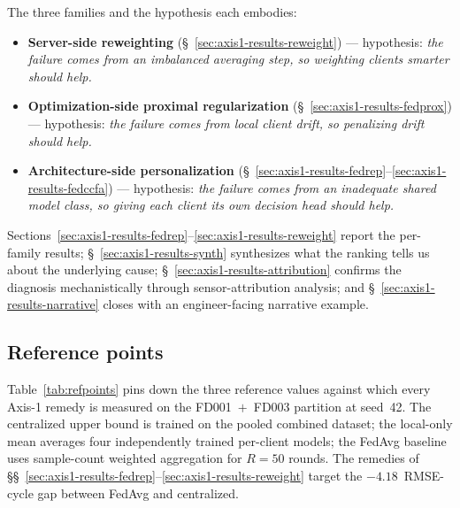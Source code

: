 \documentclass[preprint,12pt,authoryear]{elsarticle}
\begin{document}
The three families and the hypothesis each embodies:
\begin{itemize}
    \item \textbf{Server-side reweighting} (\S~\ref{sec:axis1-results-reweight}) --- hypothesis: \emph{the failure comes from an imbalanced averaging step, so weighting clients smarter should help.}
    \item \textbf{Optimization-side proximal regularization} (\S~\ref{sec:axis1-results-fedprox}) --- hypothesis: \emph{the failure comes from local client drift, so penalizing drift should help.}
    \item \textbf{Architecture-side personalization} (\S~\ref{sec:axis1-results-fedrep}--\ref{sec:axis1-results-fedccfa}) --- hypothesis: \emph{the failure comes from an inadequate shared model class, so giving each client its own decision head should help.}
\end{itemize}

Sections~\ref{sec:axis1-results-fedrep}--\ref{sec:axis1-results-reweight}
report the per-family results; \S~\ref{sec:axis1-results-synth}
synthesizes what the ranking tells us about the underlying cause;
\S~\ref{sec:axis1-results-attribution} confirms the diagnosis
mechanistically through sensor-attribution analysis; and
\S~\ref{sec:axis1-results-narrative} closes with an engineer-facing
narrative example.

\subsection{Reference points}
\label{sec:axis1-results-refpoints}

Table~\ref{tab:refpoints} pins down the three reference values against
which every Axis-1 remedy is measured on the FD001~$+$~FD003 partition
at seed~42. The centralized upper bound is trained on the pooled
combined dataset; the local-only mean averages four independently
trained per-client models; the FedAvg baseline uses sample-count
weighted aggregation for $R = 50$ rounds. The remedies of
\S\S~\ref{sec:axis1-results-fedrep}--\ref{sec:axis1-results-reweight}
target the $-4.18$~RMSE-cycle gap between FedAvg and centralized.
\end{document}
